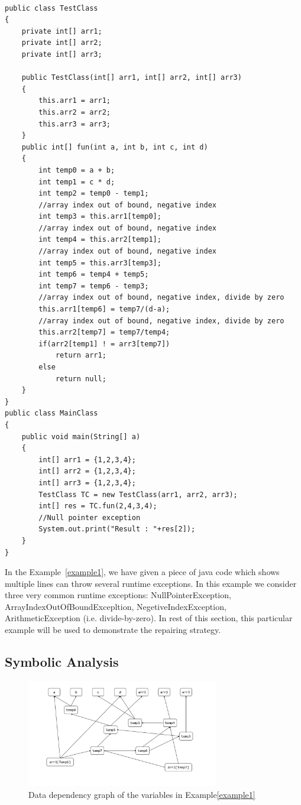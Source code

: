 \documentclass{sigplanconf}
\begin{document}
\lstset{language=Java, caption=Java code which may throws runtime exceptions, label=example1}
\begin{lstlisting}

public class TestClass
{
	private int[] arr1;
	private int[] arr2;
	private int[] arr3;
		
	public TestClass(int[] arr1, int[] arr2, int[] arr3)
	{
		this.arr1 = arr1;
		this.arr2 = arr2;
		this.arr3 = arr3;
	}
	public int[] fun(int a, int b, int c, int d)
	{
		int temp0 = a + b;
		int temp1 = c * d;
		int temp2 = temp0 - temp1;
		//array index out of bound, negative index
		int temp3 = this.arr1[temp0];
		//array index out of bound, negative index
		int temp4 = this.arr2[temp1];
		//array index out of bound, negative index
		int temp5 = this.arr3[temp3];
		int temp6 = temp4 + temp5;
		int temp7 = temp6 - temp3;
		//array index out of bound, negative index, divide by zero
		this.arr1[temp6] = temp7/(d-a);
		//array index out of bound, negative index, divide by zero
		this.arr2[temp7] = temp7/temp4;
		if(arr2[temp1] ! = arr3[temp7])
			return arr1;
		else
			return null;
	}
}
public class MainClass 
{
	public void main(String[] a) 
	{
		int[] arr1 = {1,2,3,4};
		int[] arr2 = {1,2,3,4};
		int[] arr3 = {1,2,3,4};
		TestClass TC = new TestClass(arr1, arr2, arr3);
		int[] res = TC.fun(2,4,3,4);
		//Null pointer exception
		System.out.print("Result : "+res[2]);
	}    
}
\end{lstlisting}

In the Example~\ref{example1}, we have given a piece of java code which shows multiple lines can throw several runtime exceptions. In this example we consider three very common runtime exceptions: NullPointerException, ArrayIndexOutOfBoundExcepltion, NegetiveIndexException, ArithmeticException (i.e. divide-by-zero). In rest of this section, this particular example will be used to demonstrate the repairing strategy.

\subsection{Symbolic Analysis}
\label{subsec:symb}


\begin{figure}[!htb]
\centering
\includegraphics[width=3.3in]{images/depG.pdf}
\caption{Data dependency graph of the variables in Example\ref{example1}}
\label{fig:datadep}
\end{figure}
\end{document}

